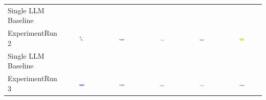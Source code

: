 \begin{table}
\begin{tabular}{@{}lccccc@{}}
    Single LLM Baseline \\
    ExperimentRun 2 & \includegraphics[width=0.15\textwidth]{./run_2/png/gpt-4o_results/Arrow.png} & \includegraphics[width=0.15\textwidth]{./run_2/png/o1-preview_results/Arrow.png} & \includegraphics[width=0.15\textwidth]{./run_2/png/claude-3-5-sonnet-20240620_results/Arrow.png} & \includegraphics[width=0.15\textwidth]{./run_2/png/watsonx_meta-llama_llama-3-1-70b-instruct_results/Arrow.png} & \includegraphics[width=0.15\textwidth]{./run_2/png/watsonx_meta-llama_llama-3-405b-instruct_results/Arrow.png} \\
    Single LLM Baseline \\
    ExperimentRun 3 & \includegraphics[width=0.15\textwidth]{./run_3/png/gpt-4o_results/Arrow.png} & \includegraphics[width=0.15\textwidth]{./run_3/png/o1-preview_results/Arrow.png} & \includegraphics[width=0.15\textwidth]{./run_3/png/claude-3-5-sonnet-20240620_results/Arrow.png} & \includegraphics[width=0.15\textwidth]{./run_3/png/watsonx_meta-llama_llama-3-1-70b-instruct_results/Arrow.png} & \includegraphics[width=0.15\textwidth]{./run_3/png/watsonx_meta-llama_llama-3-405b-instruct_results/Arrow.png} \\

\end{tabular}
\end{table}
